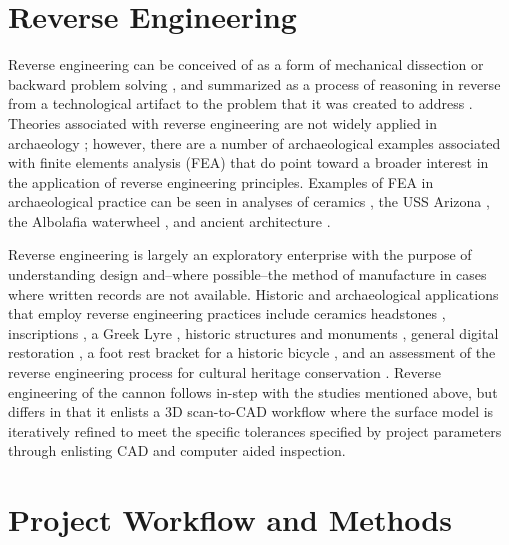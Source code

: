 \documentclass[review]{elsarticle}
\begin{document}
\section*{Reverse Engineering}

Reverse engineering can be conceived of as a form of mechanical dissection or backward problem solving \citep{RN5750}, and summarized as a process of reasoning in reverse from a technological artifact to the problem that it was created to address \citep{RN5751}. Theories associated with reverse engineering are not widely applied in archaeology \citep{RN5752}; however, there are a number of archaeological examples associated with finite elements analysis (FEA) that do point toward a broader interest in the application of reverse engineering principles. Examples of FEA in archaeological practice can be seen in analyses of ceramics \citep{RN327,RN5753}, the USS Arizona \citep{RN325}, the Albolafia waterwheel \citep{RN5754}, and ancient architecture \citep{RN5755}. 

Reverse engineering is largely an exploratory enterprise with the purpose of understanding design and--where possible--the method of manufacture in cases where written records are not available. Historic and archaeological applications that employ reverse engineering practices include ceramics \citep{RN5769,RN5770} headstones \citep{RN456}, inscriptions \citep{RN5756}, a Greek Lyre \citep{RN5757}, historic structures and monuments \citep{RN5771,RN5772}, general digital restoration \citep{RN5760}, a foot rest bracket for a historic bicycle \citep{RN5758}, and an assessment of the reverse engineering process for cultural heritage conservation \citep{RN5759}. Reverse engineering of the cannon follows in-step with the studies mentioned above, but differs in that it enlists a 3D scan-to-CAD workflow where the surface model is iteratively refined to meet the specific tolerances specified by project parameters through enlisting CAD and computer aided inspection.

\section*{Project Workflow and Methods}
\end{document}
